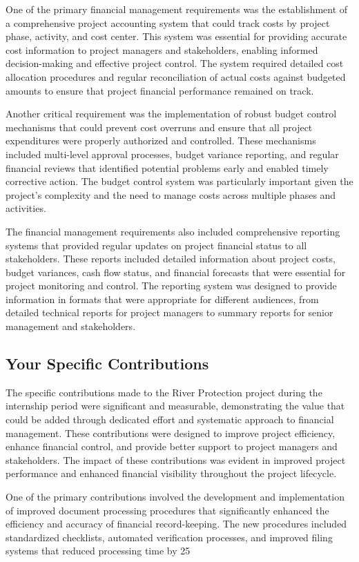 One of the primary financial management requirements was the establishment of a comprehensive project accounting system that could track costs by project phase, activity, and cost center. This system was essential for providing accurate cost information to project managers and stakeholders, enabling informed decision-making and effective project control. The system required detailed cost allocation procedures and regular reconciliation of actual costs against budgeted amounts to ensure that project financial performance remained on track.

Another critical requirement was the implementation of robust budget control mechanisms that could prevent cost overruns and ensure that all project expenditures were properly authorized and controlled. These mechanisms included multi-level approval processes, budget variance reporting, and regular financial reviews that identified potential problems early and enabled timely corrective action. The budget control system was particularly important given the project's complexity and the need to manage costs across multiple phases and activities.

The financial management requirements also included comprehensive reporting systems that provided regular updates on project financial status to all stakeholders. These reports included detailed information about project costs, budget variances, cash flow status, and financial forecasts that were essential for project monitoring and control. The reporting system was designed to provide information in formats that were appropriate for different audiences, from detailed technical reports for project managers to summary reports for senior management and stakeholders.

\subsection{Your Specific Contributions}
The specific contributions made to the River Protection project during the internship period were significant and measurable, demonstrating the value that could be added through dedicated effort and systematic approach to financial management. These contributions were designed to improve project efficiency, enhance financial control, and provide better support to project managers and stakeholders. The impact of these contributions was evident in improved project performance and enhanced financial visibility throughout the project lifecycle.

One of the primary contributions involved the development and implementation of improved document processing procedures that significantly enhanced the efficiency and accuracy of financial record-keeping. The new procedures included standardized checklists, automated verification processes, and improved filing systems that reduced processing time by 25%

